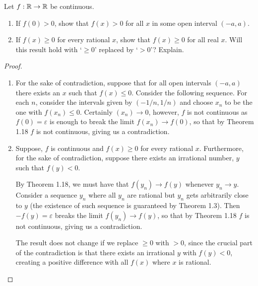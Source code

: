 \begin{exercise}{46}
Let $f:\mathbb{R}\to\mathbb{R}$ be continuous.
\begin{enumerate}
    \item If $f(0)>0$, show that $f(x)>0$ for all $x$ in some open interval $(-a,a)$.
    \item If $f(x)\geq 0$ for every rational $x$, show that $f(x)\geq 0$ for all real $x$. Will this result hold with `$\geq 0$' replaced by `$>0$'? Explain.
\end{enumerate}
\end{exercise}
\begin{proof}
\begin{enumerate}
    \item For the sake of contradiction, suppose that for all open intervals $(-a,a)$ there exists an $x$ such that $f(x)\leq 0$. Consider the following sequence. For each $n$, consider the intervals given by $(-1/n,1/n)$ and choose $x_n$ to be the one with $f(x_n)\leq 0$. Certainly $(x_n)\to 0$, however, $f$ is not continuous as $f(0)=\varepsilon$ is enough to break the limit $f(x_n)\to f(0)$, so that by Theorem 1.18 $f$ is not continuous, giving us a contradiction. 
    \item Suppose, $f$ is continuous and $f(x)\geq 0$ for every rational $x$. Furthermore, for the sake of contradiction, suppose there exists an irrational number, $y$ such that $f(y)<0$.

    By Theorem 1.18, we must have that $f(y_n)\to f(y)$ whenever $y_n\to y$. Consider a sequence $y_n$ where all $y_n$ are rational but $y_n$ gets arbitrarily close to $y$ (the existence of such sequence is guaranteed by Theorem 1.3). Then $-f(y)=\varepsilon$ breaks the limit $f(y_n)\to f(y)$, so that by Theorem 1.18 $f$ is not continuous, giving us a contradiction.

    The result does not change if we replace $\geq 0$ with $>0$, since the crucial part of the contradiction is that there exists an irrational $y$ with $f(y)<0$, creating a positive difference with all $f(x)$ where $x$ is rational.
\end{enumerate}
\end{proof}


